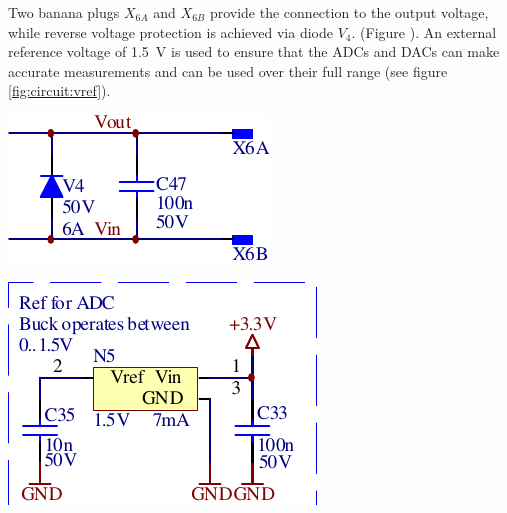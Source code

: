 Two  banana  plugs  $X_{6A}$  and  $X_{6B}$  provide  the  connection  to  the
output  voltage,  while  reverse  voltage protection  is  achieved  via  diode
$V_4$.   (Figure \label{fig:circuit:output}).   An external  reference voltage
of  \SI{1.5}{\volt}  is  used to  ensure  that  the  ADCs  and DACs  can  make
accurate  measurements and  can  be used  over their  full  range (see  figure
\ref{fig:circuit:vref}).

\begin{minipage}{.50\textwidth}
    \center
    \includegraphics[width=.9\textwidth]{images/circuit/output-connectors.pdf}
    \label{fig:circuit:output}
\end{minipage}
\begin{minipage}{.50\textwidth}
    \center
    \includegraphics[width=.9\textwidth]{images/circuit/vref.pdf}
    \label{fig:circuit:vref}
\end{minipage}

